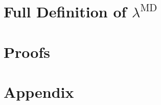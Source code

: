 \documentclass[runningheads]{llncs}
\newcommand{\LMD}{$\lambda^{\textrm{MD}}$\xspace}
\begin{document}
\iffullversion
\appendix

\newtheorem{dfn}{Defnition}
\newtheorem{ex}{Example}
\newtheorem{cm}{Comment}
\newcommand{\figheader}[2]{
  \begin{flushleft}
    #2 {\bf \normalsize #1}
\end{flushleft}}

\newpage
\section{Full Definition of \LMD}


\section{Proofs}


\fi
\section{Appendix}
\end{document}
